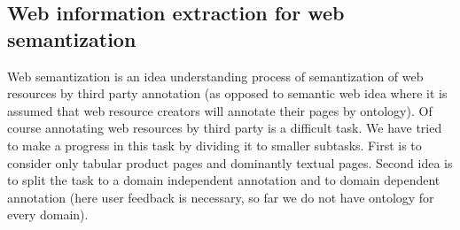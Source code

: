\subsection{Web information extraction for web semantization}

Web semantization is an idea understanding process of semantization of web resources by third party annotation (as opposed to semantic web idea where it is assumed that web resource creators will annotate their pages by ontology). Of course annotating web resources by third party is a difficult task. We have tried to make a progress in this task by dividing it to smaller subtasks. First is to consider only tabular product pages and dominantly textual pages. Second idea is to split the task to a domain independent annotation and to domain dependent annotation (here user feedback is necessary, so far we do not have ontology for every domain).

